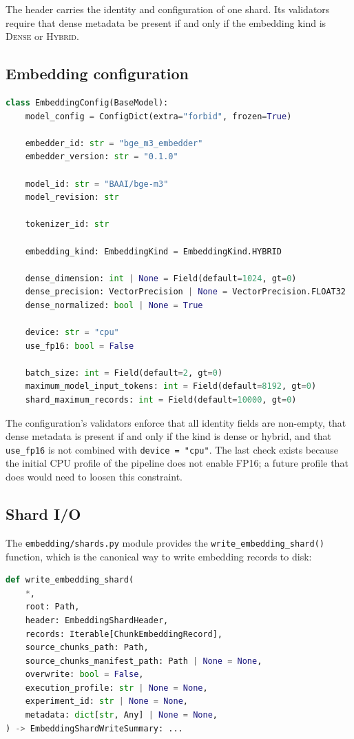 \documentclass[11pt,a4paper]{article}
\begin{document}
The header carries the identity and configuration of one shard. Its
validators require that dense metadata be present if and only if the
embedding kind is \textsc{Dense} or \textsc{Hybrid}.

\subsection{Embedding configuration}
\begin{lstlisting}[language=python]
class EmbeddingConfig(BaseModel):
    model_config = ConfigDict(extra="forbid", frozen=True)

    embedder_id: str = "bge_m3_embedder"
    embedder_version: str = "0.1.0"

    model_id: str = "BAAI/bge-m3"
    model_revision: str

    tokenizer_id: str

    embedding_kind: EmbeddingKind = EmbeddingKind.HYBRID

    dense_dimension: int | None = Field(default=1024, gt=0)
    dense_precision: VectorPrecision | None = VectorPrecision.FLOAT32
    dense_normalized: bool | None = True

    device: str = "cpu"
    use_fp16: bool = False

    batch_size: int = Field(default=2, gt=0)
    maximum_model_input_tokens: int = Field(default=8192, gt=0)
    shard_maximum_records: int = Field(default=10000, gt=0)
\end{lstlisting}

The configuration's validators enforce that all identity fields are
non-empty, that dense metadata is present if and only if the kind is
dense or hybrid, and that \texttt{use\_fp16} is not combined with
\texttt{device = "cpu"}. The last check exists because the initial
CPU profile of the pipeline does not enable FP16; a future profile
that does would need to loosen this constraint.

\subsection{Shard I/O}
The \texttt{embedding/shards.py} module provides the
\texttt{write\_embedding\_shard()} function, which is the canonical
way to write embedding records to disk:

\begin{lstlisting}[language=python]
def write_embedding_shard(
    *,
    root: Path,
    header: EmbeddingShardHeader,
    records: Iterable[ChunkEmbeddingRecord],
    source_chunks_path: Path,
    source_chunks_manifest_path: Path | None = None,
    overwrite: bool = False,
    execution_profile: str | None = None,
    experiment_id: str | None = None,
    metadata: dict[str, Any] | None = None,
) -> EmbeddingShardWriteSummary: ...
\end{lstlisting}
\end{document}
